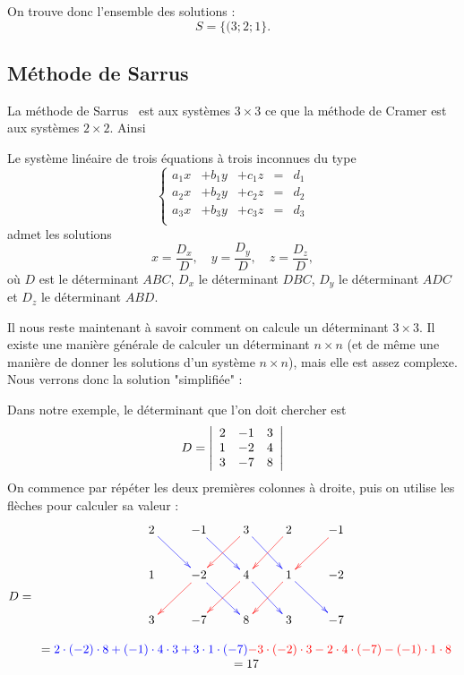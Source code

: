 On trouve donc l'ensemble des solutions :
$$
S=\{(3;2;1\}.
$$

\subsection{Méthode de Sarrus}

La méthode de Sarrus~ est aux systèmes $3\times 3$ ce que la méthode de Cramer est aux systèmes $2\times 2$. Ainsi 

\begin{theoreme}
Le système linéaire de trois équations à  trois inconnues du type
$$
\left\{
\begin{array}{rrrcr}
a_1 x & +b_1 y & + c_1 z &=&d_1\\
a_2 x & +b_2 y & + c_2 z &=&d_2\\
a_3 x & +b_3 y & + c_3 z &=&d_3\\
\end{array}
\right.
$$
admet les solutions
$$
x= \frac{D_x}{D}, \quad y=\frac{D_y}{D}, \quad z = \frac{D_z}{D},
$$
où $D$ est le déterminant $ABC$, $D_x$ le déterminant $DBC$, $D_y$ le déterminant $ADC$ et $D_z$ le déterminant $ABD$.
\end{theoreme}

Il nous reste maintenant à savoir comment on calcule un déterminant $3\times 3$. Il existe  une manière générale de calculer un déterminant $n\times n$ (et de même une manière de donner les solutions d'un système $n\times n$), mais elle est assez complexe. Nous verrons donc la solution "simplifiée" :

Dans notre exemple, le déterminant que l'on doit chercher est
$$
D=
\left|
\begin{array}{ccc}
2&-1&3\\
1&-2&4\\
3&-7&8
\end{array}
\right|
$$
On commence par répéter les deux premières colonnes à droite, puis on utilise les flèches pour calculer sa valeur :
$$D=
\begin{array}{c}
\xymatrix{
2\ar@[blue][rd]&-1\ar@[blue][rd]&3\ar@[blue][rd] \ar@[red][ld]&2\ar@[red][ld]&-1\ar@[red][ld]\\
1&-2\ar@[blue][rd]\ar@[red][ld]&4\ar@[blue][rd]\ar@[red][ld]&1\ar@[blue][rd]\ar@[red][ld]&-2\\
3&-7&8&3&-7\\
}\\
\\
= \textcolor{blue}{2 \cdot (-2) \cdot 8 + (-1)\cdot 4 \cdot 3 + 3\cdot 1  \cdot(-7)} \textcolor{red}{-3\cdot (-2)\cdot 3 -2\cdot 4 \cdot (-7) - (-1)\cdot 1 \cdot 8}\\
= 17\\
\end{array}
$$

